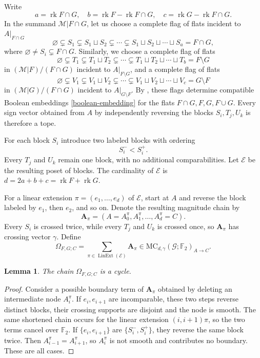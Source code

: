 \documentclass[10pt]{amsart}
\theoremstyle{plain}
\newtheorem{lemma}[theorem]{Lemma}
\theoremstyle{definition}
\newcommand{\G}{\mathcal{G}}
\newcommand{\MC}{\mathrm{MC}}
\newcommand{\M}{\mathcal{M}}
\newcommand{\rk}{\operatorname{rk}}
\newcommand{\Ftwo}{\mathbb F_2}
\newcommand{\bA}{\boldsymbol{A}}
\begin{document}
Write
\[
a=\rk F\cap G, \quad b=\rk F-\rk F\cap G, \quad c=\rk G-\rk F\cap G.
\]
In the summand $\M|F\cap G$, let us choose a complete flag of flats incident to $A|_{F\cap G}$
\[
\varnothing\subsetneq S_1 \subsetneq S_1\sqcup S_2 \subsetneq\cdots\subsetneq S_1\sqcup S_2\sqcup\cdots \sqcup S_a=F\cap G,
\]
where $\varnothing\neq S_i\subsetneq F\cap G$. Similarly, we choose a complete flag of flats
\[
\varnothing\subsetneq T_1 \subsetneq T_1\sqcup T_2 \subsetneq\cdots\subsetneq T_1\sqcup T_2\sqcup\cdots \sqcup T_b=F\setminus G
\]
in $(\M|F)/(F\cap G)$ incident to $A|_{F\setminus G}$, and a complete flag of flats
\[
\varnothing\subsetneq V_1 \subsetneq V_1\sqcup V_2 \subsetneq\cdots\subsetneq V_1\sqcup V_2\sqcup\cdots \sqcup V_c=G\setminus F
\]
in $(\M|G)/(F\cap G)$ incident to $A|_{G\setminus F}$. By , these flags determine compatible Boolean embeddings \eqref{boolean-embedding} for the flats $F\cap G,F,G,F\cup G$. Every sign vector obtained from $A$ by independently reversing the blocks $S_i,T_j,U_k$ is therefore a tope.

For each block $S_i$ introduce two labeled blocks with ordering
\[
S_i^-<S_i^+.
\]
Every $T_j$ and $U_k$ remain one block, with no additional comparabilities. Let $\mathscr{E}$ be the resulting poset of blocks. The cardinality of $\mathscr{E}$ is $d=2a+b+c=\rk F+\rk G$.

For a linear extension $\pi=(e_1,\ldots,e_d)$ of $\mathscr{E}$, start at $A$ and reverse the block labeled by $e_1$, then $e_2$, and so on. Denote the resulting magnitude chain by
\[
\bA_\pi=(A=A_0^\pi,A_1^\pi,\ldots,A_d^\pi=C).
\]
Every $S_i$ is crossed twice, while every $T_j$ and $U_k$ is crossed once, so $\bA_\pi$ has crossing vector $\gamma$. Define
\[
\Omega_{F,G;C}=\sum_{\pi\in\operatorname{LinExt}(\mathscr{E})}\bA_\pi\in\MC_{d,\gamma}(\G;\Ftwo)_{A\to C}.
\]

\begin{lemma}
The chain $\Omega_{F,G;C}$ is a cycle.
\end{lemma}

\begin{proof}
Consider a possible boundary term of $\bA_\pi$ obtained by deleting an intermediate node $A_i^\pi$. If $e_i,e_{i+1}$ are incomparable, these two steps reverse distinct blocks, their crossing supports are disjoint and the node is smooth. The same shortened chain occurs for the linear extension $(i,i+1)\pi$, so the two terms cancel over $\Ftwo$. If $\{e_i,e_{i+1}\}$ are $\{S_i^-,S_i^+\}$, they reverse the same block twice.  Then $A_{i-1}^\pi=A_{i+1}^\pi$, so $A_i^\pi$ is not smooth and contributes no boundary. These are all cases.
\end{proof}
\end{document}
